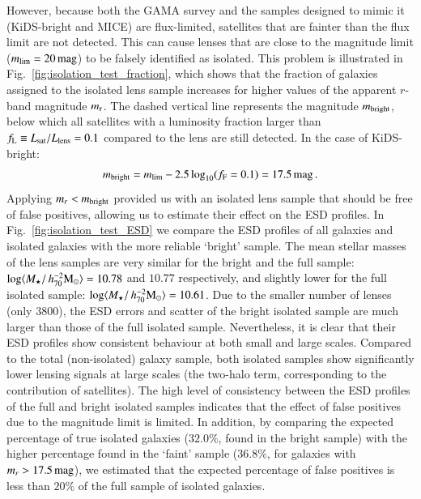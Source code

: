 \documentclass{aa}
\newcommand{\hmsun}{\,h_{70}^{-2} {\rm M_\odot}}
\newcommand{\magn}{\,{\rm mag} }
\newcommand*{\meanb}[1]{\langle{#1}\rangle}
\newcommand{\un}[1]{_{\rm #1}}
\begin{document}
However, because both the GAMA survey and the samples designed to mimic it (KiDS-bright and MICE) are flux-limited, satellites that are fainter than the flux limit are not detected. This can cause lenses that are close to the magnitude limit ($m\un{lim}=20 \magn$) to be falsely identified as isolated. This problem is illustrated in Fig.~\ref{fig:isolation_test_fraction}, which shows that the fraction of galaxies assigned to the isolated lens sample increases for higher values of the apparent $r$-band magnitude $m\un{r}$. The dashed vertical line represents the magnitude $m\un{bright}$, below which all satellites with a luminosity fraction larger than $f\un{L} \equiv L\un{sat}/L\un{lens}=0.1$ compared to the lens are still detected. In the case of KiDS-bright:
\begin{equation}
m\un{bright} = m\un{lim} - 2.5 \log_{10}(f\un{F}=0.1) = 17.5 \magn \, .
\end{equation}
Applying $m_r < m\un{bright}$ provided us with an isolated lens sample that should be free of false positives, allowing us to estimate their effect on the ESD profiles. In Fig.~\ref{fig:isolation_test_ESD} we compare the ESD profiles of all galaxies and isolated galaxies with the more reliable `bright' sample. The mean stellar masses of the lens samples are very similar for the bright and the full sample: $\log\meanb{M_\star/\hmsun} = 10.78$ and $10.77$ respectively, and slightly lower for the full isolated sample: $\log\meanb{M_\star/\hmsun} = 10.61$. Due to the smaller number of lenses (only $3800$), the ESD errors and scatter of the bright isolated sample are much larger than those of the full isolated sample. Nevertheless, it is clear that their ESD profiles show consistent behaviour at both small and large scales. Compared to the total (non-isolated) galaxy sample, both isolated samples show significantly lower lensing signals at large scales (the two-halo term, corresponding to the contribution of satellites). The high level of consistency between the ESD profiles of the full and bright isolated samples indicates that the effect of false positives due to the magnitude limit is limited. In addition, by comparing the expected percentage of true isolated galaxies ($32.0\%$, found in the bright sample) with the higher percentage found in the `faint' sample ($36.8\%$, for galaxies with $m_r > 17.5 \magn$), we estimated that the expected percentage of false positives is less than $20\%$ of the full sample of isolated galaxies.
\end{document}
